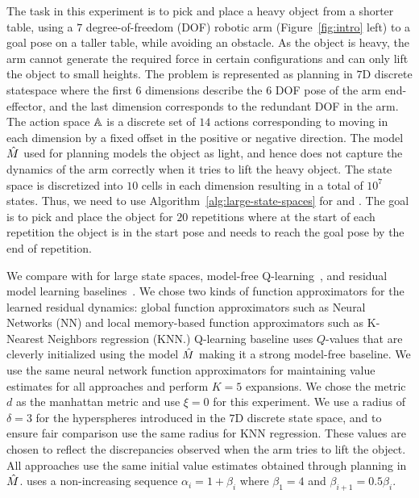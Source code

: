 The task in this experiment is to pick and place a
heavy object from a shorter table, using a $7$ degree-of-freedom (DOF) robotic arm
(Figure~\ref{fig:intro} left) to a
goal pose on a taller table, while avoiding an obstacle.
As the object is heavy, the arm cannot generate the
required force in certain configurations and can only lift the object
to small heights. The problem is represented as planning in $7$D
discrete statespace where the first $6$ dimensions describe the $6$
DOF pose of the arm end-effector, and the last dimension
corresponds to the redundant DOF in the arm. The action
space $\mathbb{A}$ is a discrete set of $14$ actions corresponding
to moving in each dimension by a fixed offset in the positive or
negative direction. The model $\hat{M}$ used for planning models the
object as light, and hence does not capture the dynamics of the arm
correctly when it tries to lift the heavy object. The state space is
discretized into $10$ cells in each dimension resulting in a total of
$10^7$ states. Thus, we need to use
Algorithm~\ref{alg:large-state-spaces} for \cmaxpp{} and
\acmaxpp{}. The goal is to
pick and place the object for $20$ repetitions where at the start of
each repetition the object is in the start pose and needs to reach the
goal pose by the end of repetition.


We compare with \cmax{} for large state spaces, model-free
Q-learning~\cite{DBLP:conf/aaai/HasseltGS16}, and residual model
learning baselines~\cite{DBLP:conf/iros/SaverianoYFL17}. We chose two
kinds of function approximators for the learned residual dynamics:
global function approximators such as Neural Networks (NN) and local
memory-based function approximators such as K-Nearest Neighbors
regression (KNN.) Q-learning baseline uses $Q$-values that are
cleverly initialized using the model $\hat{M}$ making it a strong model-free
baseline. We use the same neural network function
approximators for maintaining value estimates for all approaches and
perform $K=5$ expansions. We chose the metric $d$ as the manhattan
metric and use $\xi = 0$ for this experiment. We use a
radius of $\delta = 3$ for the hyperspheres introduced in the $7$D
discrete state space, and to ensure fair comparison use the same
radius for KNN regression. These values are chosen to reflect the
discrepancies observed when the arm tries to lift the object. All
approaches use the same initial value estimates obtained through
planning in $\hat{M}$. \acmaxpp{} uses a non-increasing sequence
$\alpha_i = 1 + \beta_i$ where $\beta_1 = 4$ and $\beta_{i+1} =
0.5\beta_i$.


